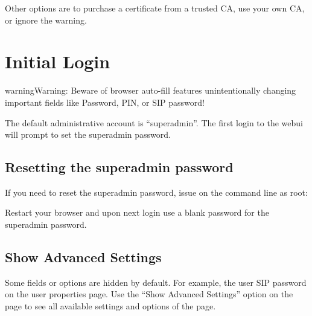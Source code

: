 \documentclass[letterpaper,10pt,english]{sphinxmanual}
\begin{document}
Other options are to purchase a certificate from a trusted CA, use your own CA, or ignore the warning.


\section{Initial Login}
\label{\detokenize{webui:initial-login}}
\begin{sphinxadmonition}{warning}{Warning:}
Beware of browser auto-fill features unintentionally changing important fields like Password, PIN, or SIP password!
\end{sphinxadmonition}

The default administrative account is “superadmin”. The first login to the webui will prompt to set the superadmin password.
\begin{quote}

\end{quote}


\subsection{Resetting the superadmin password}
\label{\detokenize{webui:resetting-the-superadmin-password}}
If you need to reset the superadmin password, issue on the command line as root:

\begin{sphinxVerbatim}[commandchars=\\\{\}]
  
\end{sphinxVerbatim}

Restart your browser and upon next login use a blank password for the superadmin password.


\subsection{Show Advanced Settings}
\label{\detokenize{webui:show-advanced-settings}}
Some fields or options are hidden by default. For example, the user SIP password on the user properties page. Use the “Show Advanced Settings” option on the page to see all available settings and options of the page.
\begin{quote}

\end{quote}
\end{document}
